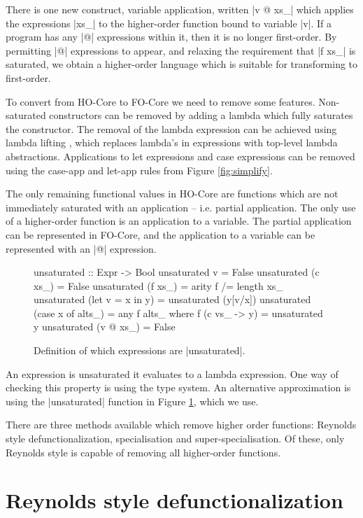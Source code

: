 There is one new construct, variable application, written |v @ xs_| which applies the expressions |xs_| to the higher-order function bound to variable |v|. If a program has any |@| expressions within it, then it is no longer first-order. By permitting |@| expressions to appear, and relaxing the requirement that |f xs_| is saturated, we obtain a higher-order language which is suitable for transforming to first-order.

To convert from HO-Core to FO-Core we need to remove some features. Non-saturated constructors can be removed by adding a lambda which fully saturates the constructor. The removal of the lambda expression can be achieved using lambda lifting \cite{lambda_lift}, which replaces lambda's in expressions with top-level lambda abstractions. Applications to let expressions and case expressions can be removed using the case-app and let-app rules from Figure \ref{fig:simplify}.

The only remaining functional values in HO-Core are functions which are not immediately saturated with an application -- i.e. partial application. The only use of a higher-order function is an application to a variable. The partial application can be represented in FO-Core, and the application to a variable can be represented with an |@| expression.

\begin{figure}
\begin{code}
unsaturated :: Expr -> Bool
unsaturated v = False
unsaturated (c xs_) = False
unsaturated (f xs_) = arity f /= length xs_
unsaturated (let v = x in y) = unsaturated (y[v/x])
unsaturated (case x of alts_) = any f alts_
    where f (c vs_ -> y) = unsaturated y
unsaturated (v @ xs_) = False
\end{code}
\caption{Definition of which expressions are |unsaturated|.}
\label{fig:unsaturated}
\end{figure}

An expression is unsaturated it evaluates to a lambda expression. One way of checking this property is using the type system. An alternative approximation is using the |unsaturated| function in Figure \ref{fig:unsaturated}, which we use.

There are three methods available which remove higher order functions: Reynolds style defunctionalization, specialisation and super-specialisation. Of these, only Reynolds style is capable of removing all higher-order functions.

\section{Reynolds style defunctionalization}

